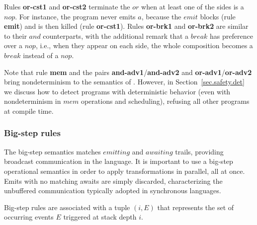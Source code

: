 Rules \textbf{or-cst1} and \textbf{or-cst2} terminate the $or$ when at least 
one of the sides is a $nop$.
For instance, the program  never emits $a$, because 
the $emit$ blocks (rule \textbf{emit}) and is then killed (rule 
\textbf{or-cst1}).
Rules \textbf{or-brk1} and \textbf{or-brk2} are similar to their $and$ 
counterparts, with the additional remark that a $break$ has preference over a 
$nop$, i.e., when they appear on each side, the whole composition becomes a 
$break$ instead of a $nop$.


Note that rule \textbf{mem} and the pairs \textbf{and-adv1}/\textbf{and-adv2} 
and \textbf{or-adv1}/\textbf{or-adv2} bring nondeterminism to the semantics of 
\CEU.
However, in Section~\ref{sec.safety.det} we discuss how to detect programs with 
deterministic behavior (even with nondeterminism in $mem$ operations and 
scheduling), refusing all other programs at compile time.

\subsubsection{Big-step rules}
\label{sec.sem.big}

The big-step semantics matches $emitting$ and $awaiting$ trails, providing 
broadcast communication in the language.
It is important to use a big-step operational semantics in order to apply 
transformations in parallel, all at once.
Emits with no matching awaits are simply discarded, characterizing the 
unbuffered communication typically adopted in synchronous languages.

Big-step rules are associated with a tuple $(i,E)$ that represents the set of 
occurring events $E$ triggered at stack depth $i$.

\begin{comment}
At the beginning of each reaction chain, only a single external event can be 
active, as required by \CEU's synchronous execution model.
Hence, initially $(i,E) = (0,\{ext\})$, where $ext$ is the external event 
triggered at starting depth $0$.

For further big steps following small steps, the tuple $(i,E)$ is acquired from 
the recursive function $pop$, which takes the deepest stack depth and groups 
all stacked emits (if any) together:

As explained for small-step rule \textbf{emit}, all stacked emits necessarily 
occur at deepest depth.
Note also that $pop$ does not need to be defined for unblocked primitives, as a 
small-step sequence that precedes a big step only terminates when the program 
becomes blocked.

We now present the big-step semantic rules.
\end{comment}


